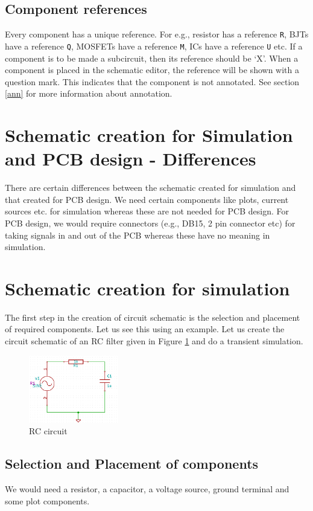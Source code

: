 \subsection{Component references}
Every component has a unique reference. For e.g., resistor has a reference {\tt R}, BJTs have a reference {\tt Q}, MOSFETs have a reference {\tt M}, ICs have a reference {\tt U} etc. If a component is to be made a subcircuit, then its reference should be `X'. When a component is placed in the schematic editor, the reference will be shown with a question mark. This indicates that the component is not annotated. See section \ref{ann} for more information about annotation.
\section{Schematic creation for Simulation and PCB design - Differences}
There are certain differences between the schematic created for simulation and that created for PCB design. We need certain components like plots, current sources etc. for simulation whereas these are not needed for PCB design. For PCB design, we would require connectors (e.g., DB15, 2 pin connector etc) for taking signals in and out of the PCB whereas these have no meaning in simulation. 
\section{Schematic creation for simulation}
The first step in the creation of circuit schematic is the selection and placement of required components. Let us see this using an example. Let us create the circuit schematic of an RC filter given in Figure \ref{schemRC} and do a transient simulation.
\begin{figure}
\centering
\includegraphics[width=0.35\textwidth]{figures/schemRC}
\caption{RC circuit}
\label{schemRC}
\end{figure}
\subsection{Selection and Placement of components}
\label{selplace}
We would need a resistor, a capacitor, a voltage source, ground terminal and some plot components. 

